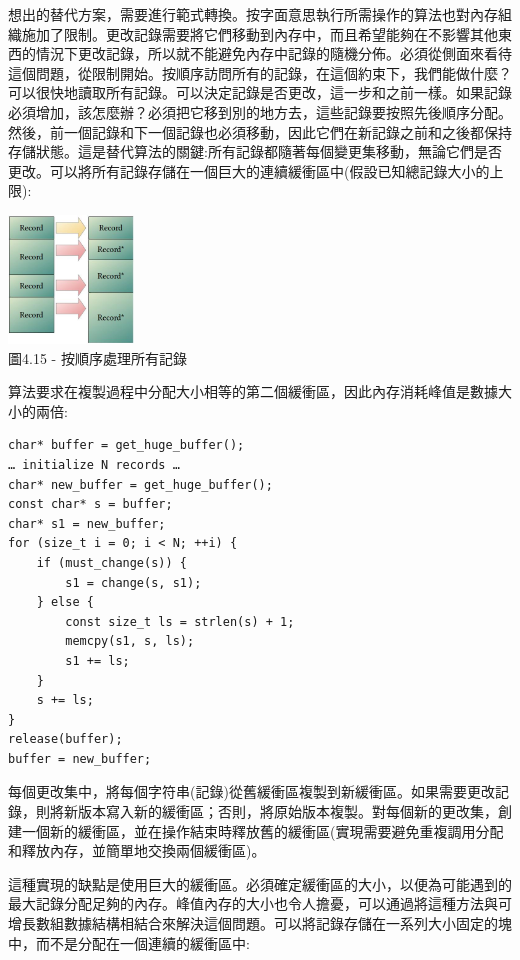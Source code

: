想出的替代方案，需要進行範式轉換。按字面意思執行所需操作的算法也對內存組織施加了限制。更改記錄需要將它們移動到內存中，而且希望能夠在不影響其他東西的情況下更改記錄，所以就不能避免內存中記錄的隨機分佈。必須從側面來看待這個問題，從限制開始。按順序訪問所有的記錄，在這個約束下，我們能做什麼？可以很快地讀取所有記錄。可以決定記錄是否更改，這一步和之前一樣。如果記錄必須增加，該怎麼辦？必須把它移到別的地方去，這些記錄要按照先後順序分配。然後，前一個記錄和下一個記錄也必須移動，因此它們在新記錄之前和之後都保持存儲狀態。這是替代算法的關鍵:所有記錄都隨著每個變更集移動，無論它們是否更改。可以將所有記錄存儲在一個巨大的連續緩衝區中(假設已知總記錄大小的上限):

\begin{center}
\includegraphics[width=0.25\textwidth]{content/1/chapter4/images/15.jpg}\\
圖4.15 - 按順序處理所有記錄
\end{center}

算法要求在複製過程中分配大小相等的第二個緩衝區，因此內存消耗峰值是數據大小的兩倍:

\begin{lstlisting}[style=styleCXX]
char* buffer = get_huge_buffer();
… initialize N records …
char* new_buffer = get_huge_buffer();
const char* s = buffer;
char* s1 = new_buffer;
for (size_t i = 0; i < N; ++i) {
	if (must_change(s)) {
		s1 = change(s, s1);
	} else {
		const size_t ls = strlen(s) + 1;
		memcpy(s1, s, ls);
		s1 += ls;
	}
	s += ls;
}
release(buffer);
buffer = new_buffer;
\end{lstlisting}

每個更改集中，將每個字符串(記錄)從舊緩衝區複製到新緩衝區。如果需要更改記錄，則將新版本寫入新的緩衝區；否則，將原始版本複製。對每個新的更改集，創建一個新的緩衝區，並在操作結束時釋放舊的緩衝區(實現需要避免重複調用分配和釋放內存，並簡單地交換兩個緩衝區)。

這種實現的缺點是使用巨大的緩衝區。必須確定緩衝區的大小，以便為可能遇到的最大記錄分配足夠的內存。峰值內存的大小也令人擔憂，可以通過將這種方法與可增長數組數據結構相結合來解決這個問題。可以將記錄存儲在一系列大小固定的塊中，而不是分配在一個連續的緩衝區中:

